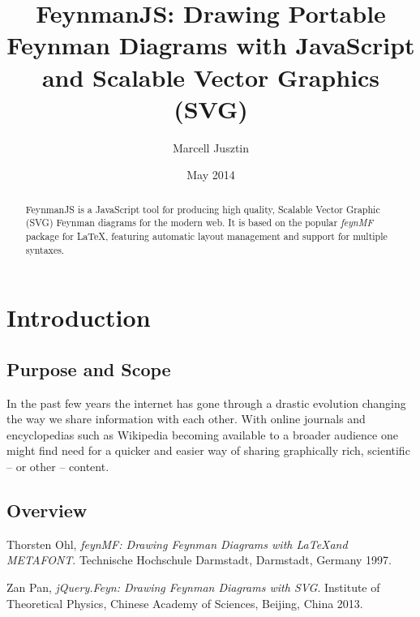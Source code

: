 \documentclass[a4paper,12pt]{article}
\title{\textbf{FeynmanJS}: Drawing Portable Feynman Diagrams with JavaScript and Scalable Vector Graphics (SVG)}
\date{May 2014}
\author{Marcell Jusztin}
\begin{document}
\maketitle
    
\begin{abstract}
FeynmanJS is a JavaScript tool for producing high quality, Scalable Vector Graphic (SVG) Feynman diagrams for the modern web. It is based on the popular \textit{feynMF}\cite{fmfmanual} package for \LaTeX, featuring automatic layout management and support for multiple syntaxes.

\end{abstract}

\section{Introduction}

\subsection{Purpose and Scope}
In the past few years the internet has gone through a drastic evolution changing the way we share information with each other. With online journals and  encyclopedias such as Wikipedia becoming available to a broader audience one might find need for a quicker and easier way of sharing graphically rich, scientific -- or other -- content\cite{zanpan}.

\subsection{Overview}


\begin{thebibliography}{10}

  Thorsten Ohl,
  \emph{feynMF: Drawing Feynman Diagrams with \LaTeX and METAFONT}.
  Technische Hochschule Darmstadt, Darmstadt, Germany
  1997.

  Zan Pan,
  \emph{jQuery.Feyn: Drawing Feynman Diagrams with SVG}.
  Institute of Theoretical Physics,
  Chinese Academy of Sciences, Beijing, China
  2013.

\end{thebibliography}
\end{document}
